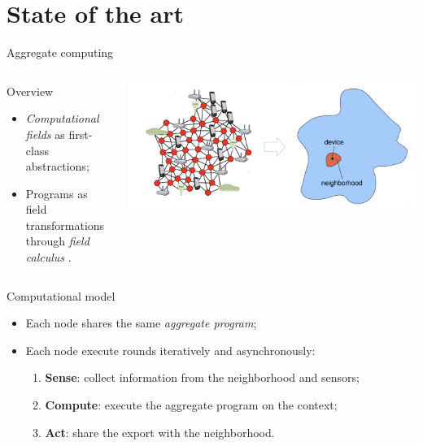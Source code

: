 \documentclass[presentation]{beamer}\mode<presentation>{\usetheme{AMSBolognaFC}}
\begin{document}
\section{State of the art}

\begin{frame}[allowframebreaks]{Aggregate computing}
\begin{columns}
\begin{column}{0.55\textwidth}
	\begin{block}{Overview}
		\begin{itemize}
			\item \emph{Computational fields} \cite{mamei2004cofields, viroli2019distributed} as first-class abstractions;
			\item Programs as field transformations through \emph{field calculus} \cite{viroli2016higher}.
		\end{itemize}
	\end{block}
\end{column}
\begin{column}{0.45\textwidth}
\includegraphics[width=\textwidth]{img/ac.png}
\end{column}
\end{columns}

\centering
\begin{alertblock}{Computational model}
\begin{itemize}
	\item Each node shares the same \emph{aggregate program};
	\item Each node execute rounds iteratively and asynchronously:
	\begin{enumerate}
		\item \textbf{Sense}: collect information from the neighborhood and sensors;
		\item \textbf{Compute}: execute the aggregate program on the context;
		\item \textbf{Act}: share the export with the neighborhood.
	\end{enumerate}
\end{itemize}
\end{alertblock}


\end{frame}
\end{document}
